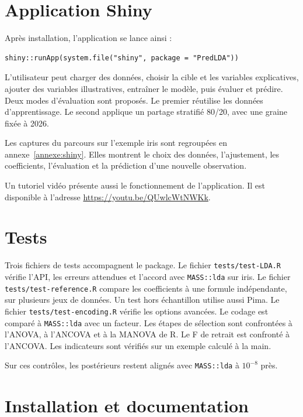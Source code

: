 \documentclass[11pt,a4paper]{article}
\begin{document}
\section{Application Shiny}

Apr\`es installation, l'application se lance ainsi :
\begin{lstlisting}
shiny::runApp(system.file("shiny", package = "PredLDA"))
\end{lstlisting}

L'utilisateur peut charger des donn\'ees, choisir la cible et les variables
explicatives, ajouter des variables illustratives, entra\^iner le mod\`ele,
puis \'evaluer et pr\'edire. Deux modes d'\'evaluation sont propos\'es. Le
premier r\'eutilise les donn\'ees d'apprentissage. Le second applique un
partage stratifi\'e 80/20, avec une graine fix\'ee \`a 2026.

Les captures du parcours sur l'exemple iris sont regroup\'ees en
annexe~\ref{annexe:shiny}. Elles montrent le choix des donn\'ees, l'ajustement,
les coefficients, l'\'evaluation et la pr\'ediction d'une nouvelle observation.

Un tutoriel vid\'eo pr\'esente aussi le fonctionnement de l'application. Il
est disponible \`a l'adresse \url{https://youtu.be/QUwlcWtNWKk}.

\section{Tests}

Trois fichiers de tests accompagnent le package.
Le fichier \texttt{tests/test-LDA.R} v\'erifie l'API, les erreurs attendues et
l'accord avec \texttt{MASS::lda} sur iris.
Le fichier \texttt{tests/test-reference.R} compare les coefficients \`a une
formule ind\'ependante, sur plusieurs jeux de donn\'ees. Un test hors
\'echantillon utilise aussi Pima.
Le fichier \texttt{tests/test-encoding.R} v\'erifie les options avanc\'ees. Le
codage est compar\'e \`a \texttt{MASS::lda} avec un facteur. Les \'etapes de
s\'election sont confront\'ees \`a l'ANOVA, \`a l'ANCOVA et \`a la MANOVA de R.
Le F de retrait est confront\'e \`a l'ANCOVA. Les indicateurs sont v\'erifi\'es
sur un exemple calcul\'e \`a la main.

Sur ces contr\^oles, les post\'erieurs restent align\'es avec
\texttt{MASS::lda} \cite{venables2002mass} \`a \(10^{-8}\) pr\`es.

\section{Installation et documentation}
\end{document}
